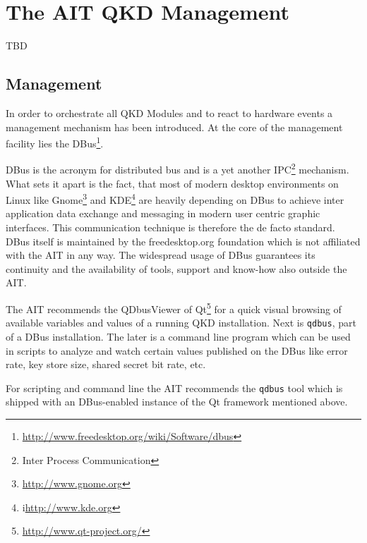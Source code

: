 \chapter{The AIT QKD Management}
\label{chap:The AIT QKD Management}

TBD



\clearpage

\section{Management}
\label{sec:Management}

In order to orchestrate all QKD Modules and to react to hardware events a management mechanism has been introduced. At the core of the management facility lies the DBus\footnote{\url{http://www.freedesktop.org/wiki/Software/dbus}}.

\medskip

DBus is the acronym for distributed bus and is a yet another IPC\footnote{Inter Process Communication} mechanism. What sets it apart is the fact, that most of modern desktop environments on Linux like Gnome\footnote{\url{http://www.gnome.org}} and KDE\footnote{i\url{http://www.kde.org}} are heavily depending on DBus to achieve inter application data exchange and messaging in modern user centric graphic interfaces. This communication technique is therefore the de facto standard. DBus itself is maintained by the freedesktop.org foundation which is not affiliated with the AIT in any way. The widespread usage of DBus guarantees its continuity and the availability of tools, support and know-how also outside the AIT.

\medskip

The AIT recommends the QDbusViewer of Qt\footnote{\url{http://www.qt-project.org/}} for a quick visual browsing of available variables and values of a running QKD installation. Next is \texttt{qdbus}, part of a DBus installation. The later is a command line program which can be used in scripts to analyze and watch certain values published on the DBus like error rate, key store size, shared secret bit rate, etc.

\medskip

For scripting and command line the AIT recommends the \texttt{qdbus} tool which is shipped with an DBus-enabled instance of the Qt framework mentioned above.